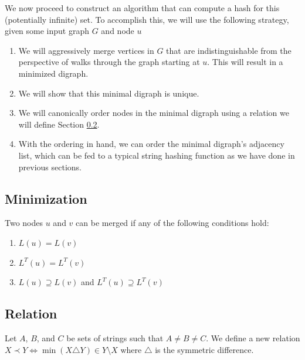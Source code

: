 \documentclass{svproc}
\begin{document}
We now proceed to construct an algorithm that can compute a hash for this (potentially infinite) set.
To accomplish this, we will use the following strategy, given some input graph $G$ and node $u$
\begin{enumerate}
  \item We will aggressively merge vertices in $G$ that are indistinguishable from the perspective of
  walks through the graph starting at $u$. This will result in a minimized digraph.
  \item We will show that this minimal digraph is unique.
  \item We will canonically order nodes in the minimal digraph using a relation we will define Section \ref{sec:relation}.
  \item With the ordering in hand, we can order the minimal digraph's adjacency list, which can be fed to a typical string hashing function as we have done in previous sections.
\end{enumerate}

\subsection{Minimization}

Two nodes $u$ and $v$ can be merged if any of the following conditions hold:

\begin{enumerate}
  \item $L(u) = L(v)$
  \item $L^T(u) = L^T(v)$
  \item $L(u) \supseteq L(v)$ and $L^T(u) \supseteq L^T(v)$
\end{enumerate}

\subsection{Relation}
\label{sec:relation}

Let $A$, $B$, and $C$ be sets of strings such that $A \neq B \neq C$. We define a new relation $X \prec Y \iff \min(X \triangle Y) \in Y \setminus X$ where $\triangle$ is the symmetric difference.
\end{document}
